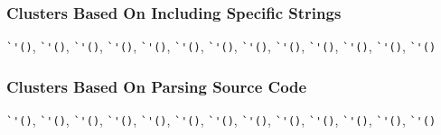 \subsubsection{Clusters Based On Including Specific Strings}
\verb!`'()!, \verb!`'()!, \verb!`'()!, \verb!`'()!, \verb!`'()!, \verb!`'()!, \verb!`'()!, \verb!`'()!, \verb!`'()!, \verb!`'()!, \verb!`'()!, \verb!`'()!, \verb!`'()!

\subsubsection{Clusters Based On Parsing Source Code}
\verb!`'()!, \verb!`'()!, \verb!`'()!, \verb!`'()!, \verb!`'()!, \verb!`'()!, \verb!`'()!, \verb!`'()!, \verb!`'()!, \verb!`'()!, \verb!`'()!, \verb!`'()!, \verb!`'()!













% 


